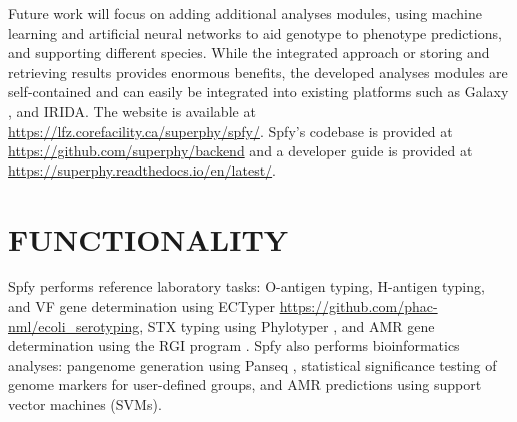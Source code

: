 \documentclass[a4,center,fleqn]{NAR}
\begin{document}
Future work will focus on adding additional analyses modules, using machine learning and artificial neural networks to aid genotype to phenotype predictions, and supporting different species. While the integrated approach or storing and retrieving results provides enormous benefits, the developed analyses modules are self-contained and can easily be integrated into existing platforms such as Galaxy \cite{goecks2010galaxy}, and IRIDA. The website is available at \url{https://lfz.corefacility.ca/superphy/spfy/}. Spfy's codebase is provided at \url{https://github.com/superphy/backend} and a developer guide is provided at \url{https://superphy.readthedocs.io/en/latest/}.



\enlargethispage{-65.1pt}



\section{FUNCTIONALITY}
Spfy performs reference laboratory tasks: O-antigen typing, H-antigen typing, and VF gene determination using ECTyper \url{https://github.com/phac-nml/ecoli_serotyping}, STX typing using Phylotyper \cite{whiteside2017phylotyper}, and AMR gene determination using the RGI program \cite{mcarthur2013comprehensive}. Spfy also performs bioinformatics analyses: pangenome generation using Panseq \cite{laing2010pan}, statistical significance testing of genome markers for user-defined groups, and AMR predictions using support vector machines (SVMs).
\end{document}
